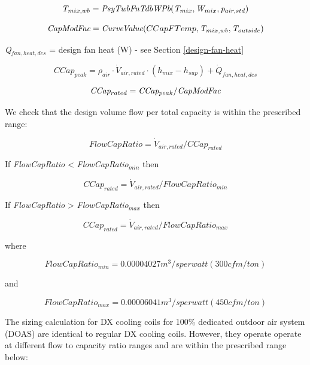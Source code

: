 \begin{equation}
\emph{T\(_{mix,wb}\)} = \emph{PsyTwbFnTdbWPb}(\emph{T\(_{mix}\)},\emph{W\(_{mix}\)}, \emph{p\(_{air,std}\)})
\end{equation}

\begin{equation}
\emph{CapModFac} = \emph{CurveValue}(CCapFTemp,\emph{T\(_{mix,wb}\)},\emph{T\(_{outside}\)})
\end{equation}

\emph{Q\(_{fan,heat,des}\)} = design fan heat (W) - see Section \ref{design-fan-heat}

\begin{equation}
CCap_{peak} = \rho_{air} \cdot \dot V_{air,rated} \cdot (h_{mix} - h_{sup}) + \dot{Q}_{fan,heat,des}
\end{equation}

\begin{equation}
\emph{CCap\(_{rated}\)} = \emph{CCap\(_{peak}\)}/ \emph{CapModFac}
\end{equation}

We check that the design volume flow per total capacity is within the prescribed range:

\begin{equation}
FlowCapRatio = \dot V_{air,rated}/CCap_{rated}
\end{equation}

If \emph{FlowCapRatio} \textless{} \emph{FlowCapRatio\(_{min}\)} then

\begin{equation}
CCap_{rated} = \dot V_{air,rated}/FlowCapRatio_{min}
\end{equation}

If \emph{FlowCapRatio} \textgreater{} \emph{FlowCapRatio\(_{max}\)} then

\begin{equation}
CCap_{rated} = \dot V_{air,rated}/FlowCapRatio_{max}
\end{equation}

where

\begin{equation}
FlowCapRatio_{min} = 0.00004027 m^{3}/s per watt (300 cfm/ton)
\end{equation}

and

\begin{equation}
FlowCapRatio_{max} = 0.00006041 m^{3}/s per watt (450 cfm/ton)
\end{equation}

The sizing calculation for DX cooling coils for 100\% dedicated outdoor air system (DOAS) are identical to regular DX cooling coils. However, they operate operate at different flow to capacity ratio ranges and are within the prescribed range below:

